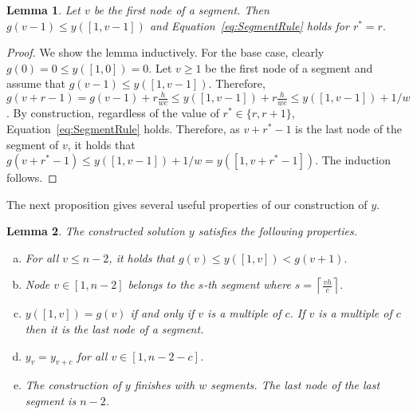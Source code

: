 \documentclass[11pt]{article}
\newtheorem{lemma}{Lemma}[section]
\newcommand\+{\mkern2mu}
\newcommand{\ceil}[1]{\left\lceil #1 \right\rceil}
\begin{document}
 \begin{lemma} Let $v$ be the first node of a segment. Then $g(v-1)\le y([1,v-1])$ and Equation~\eqref{eq:SegmentRule} holds for $r^*=r.$
 \end{lemma}
 \begin{proof}
  We show the lemma inductively. For the base case, clearly $g(0)=0\le y([1,0])=0$. Let $v\ge 1$ be the first node of a segment and assume that $g(v-1)\le y([1,v-1])$. Therefore, $g(v+r-1)=g(v-1)+r\frac{h}{wc}\le y([1,v-1]) + r\frac{h}{wc} \le y([1,v-1]) + 1/w$. By construction, regardless of the value of $r^*\in \{r,r+1\}$, Equation~\eqref{eq:SegmentRule} holds. Therefore, as $v+r^*-1$ is the last node of the segment of $v$, it holds that $g(v+r^*-1)\le y([1,v-1])+1/w = y([1,v+r^*-1])$. The induction follows.
 \end{proof}
 
 
 The next proposition gives several useful properties of our construction of $y$. 

 \begin{lemma}    
    The constructed solution $y$ satisfies the following properties.
    \begin{enumerate}[a)]
        \item For all $v \leq  n-2$, it holds that $g(v) \leq y([1,v]) < g(v+1).$ \label{it:a}
         \item Node $v\in [1,n-2]$ belongs to the $s$-th segment where 
          $s=\ceil{\frac{vh}{c}}.$ \label{it:b}
        \item $y([1, v]) = g(v)$ if and only if $v$ is a multiple of $c$. If $v$ is a multiple of $c$ then it is the last node of a segment.\label{it:c}
        \item $y_v=y_{v+c}$ for all $v\in [1,n-2-c]$. \label{it:d}
        \item The construction of $y$ finishes with $w$ segments. The last node of the last segment is $n-2$. \label{it:e}
    \end{enumerate}
    \label{lm:yProperties}
\end{lemma}
\end{document}
